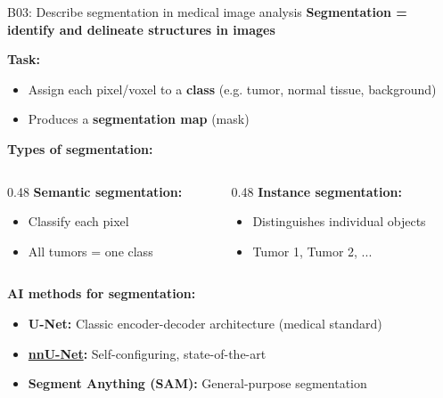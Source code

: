 \documentclass[aspectratio=169, 10pt]{beamer}
\begin{document}
\begin{frame}{B03: Describe segmentation in medical image analysis}
    \textbf{Segmentation = identify and delineate structures in images}
    
    \vspace{0.3cm}
    \textbf{Task:}
    \begin{itemize}
        \item Assign each pixel/voxel to a \textbf{class} (e.g. tumor, normal tissue, background)
        \item Produces a \textbf{segmentation map} (mask)
    \end{itemize}
    
    \vspace{0.3cm}
    \textbf{Types of segmentation:}
    \begin{columns}[T]
        \begin{column}{0.48\textwidth}
            \textbf{Semantic segmentation:}
            \begin{itemize}
                \item Classify each pixel
                \item All tumors = one class
            \end{itemize}
        \end{column}
        \begin{column}{0.48\textwidth}
            \textbf{Instance segmentation:}
            \begin{itemize}
                \item Distinguishes individual objects
                \item Tumor 1, Tumor 2, ...
            \end{itemize}
        \end{column}
    \end{columns}
    
    \vspace{0.3cm}
    \textbf{AI methods for segmentation:}
    \begin{itemize}
        \item \textbf{U-Net:} Classic encoder-decoder architecture (medical standard)
        \item \textbf{\href{https://github.com/MIC-DKFZ/nnUNet}{nnU-Net}:} Self-configuring, state-of-the-art
        \item \textbf{Segment Anything (SAM):} General-purpose segmentation
    \end{itemize}
\end{frame}
\end{document}
